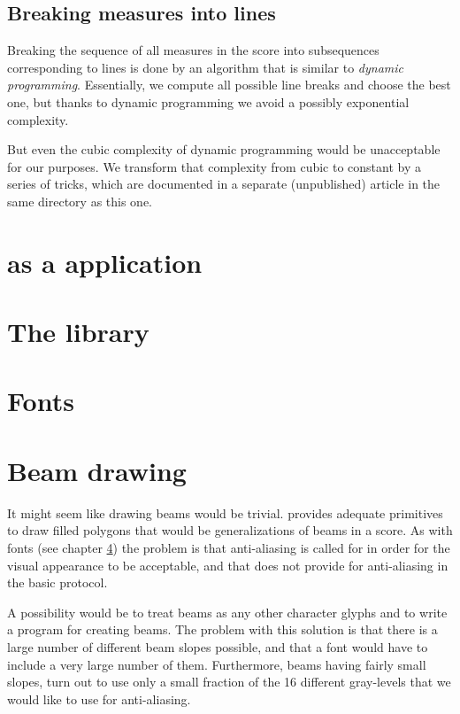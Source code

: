 \section{Breaking measures into lines}

Breaking the sequence of all measures in the score into subsequences
corresponding to lines is done by an algorithm that is similar to
\emph{dynamic programming}.  Essentially, we compute all possible line
breaks and choose the best one, but thanks to dynamic programming we
avoid a possibly exponential complexity.  

But even the cubic complexity of dynamic programming would be
unacceptable for our purposes.  We transform that complexity from
cubic to constant by a series of tricks, which are documented in a
separate (unpublished) article in the same directory as this one. 

\chapter{\sysname{} as a {\clim} application}

\chapter{The {\obseq} library}

\chapter{Fonts}
\label{chap-fonts}

\chapter{Beam drawing}

It might seem like drawing beams would be trivial.  {\xwin} provides
adequate primitives to draw filled polygons that would be
generalizations of beams in a score.  As with fonts (see chapter
\ref{chap-fonts}) the problem is that anti-aliasing is called for in
order for the visual appearance to be acceptable, and that {\xwin}
does not provide for anti-aliasing in the basic protocol.  

A possibility would be to treat beams as any other character glyphs
and to write a {\metafont} program for creating beams.  The problem
with this solution is that there is a large number of different beam
slopes possible, and that a font would have to include a very large
number of them.  Furthermore, beams having fairly small slopes, turn
out to use only a small fraction of the 16 different gray-levels that
we would like to use for anti-aliasing. 

